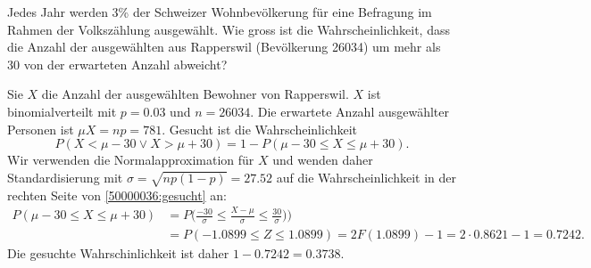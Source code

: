 Jedes Jahr werden 3\% der Schweizer Wohnbevölkerung für eine Befragung
im Rahmen der Volks\-zählung ausgewählt.
Wie gross ist die Wahrscheinlichkeit, dass die Anzahl der ausgewählten
aus Rapperswil (Bevölkerung 26034) um mehr als 30 von der erwarteten
Anzahl abweicht?

\begin{loesung}
Sie $X$ die Anzahl der ausgewählten Bewohner von Rapperswil.
$X$ ist binomialverteilt mit $p=0.03$ und $n=26034$.
Die erwartete Anzahl ausgewählter Personen ist $\mu X=np=781$.
Gesucht ist die Wahrscheinlichkeit
\begin{equation}
P(X < \mu - 30 \vee X > \mu + 30)
=
1-P(\mu - 30 \le X \le \mu + 30).
\label{50000036:gesucht}
\end{equation}
Wir verwenden die Normalapproximation für $X$ und wenden daher
Standardisierung mit $\sigma=\sqrt{np(1-p)}=27.52$ auf
die Wahrscheinlichkeit in der rechten Seite von
\eqref{50000036:gesucht}
an:
\begin{align*}
P(\mu - 30 \le X \le \mu + 30)
&=
P\biggl(
\frac{-30}{\sigma} \le \frac{X-\mu}{\sigma} \le \frac{30}{\sigma})
\biggr)
\\
&=
P(-1.0899 \le Z \le 1.0899)
=
2F(1.0899)-1
=
2\cdot 0.8621 - 1
=
0.7242.
\end{align*}
Die gesuchte Wahrschinlichkeit ist daher $1-0.7242= 0.3738$.
\end{loesung}


